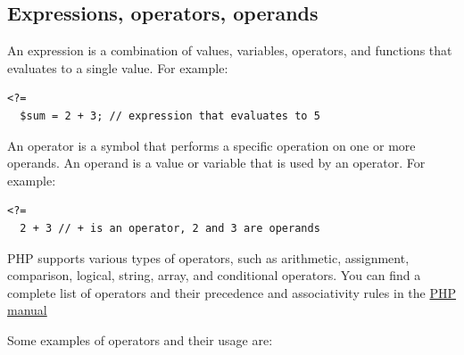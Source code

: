 \documentclass[11pt]{article}
\begin{document}
\subsection{Expressions, operators, operands}
\label{sec:org026340e}
An expression is a combination of values, variables, operators, and
functions that evaluates to a single value. For example:

\begin{verbatim}
<?=
  $sum = 2 + 3; // expression that evaluates to 5
\end{verbatim}

An operator is a symbol that performs a specific operation on one or
more operands. An operand is a value or variable that is used by an
operator. For example:

\begin{verbatim}
<?=
  2 + 3 // + is an operator, 2 and 3 are operands
\end{verbatim}

PHP supports various types of operators, such as arithmetic,
assignment, comparison, logical, string, array, and conditional
operators. You can find a complete list of operators and their
precedence and associativity rules in the \href{https://www.php.net/manual/en/language.operators.php}{PHP manual}

Some examples of operators and their usage are:
\end{document}
